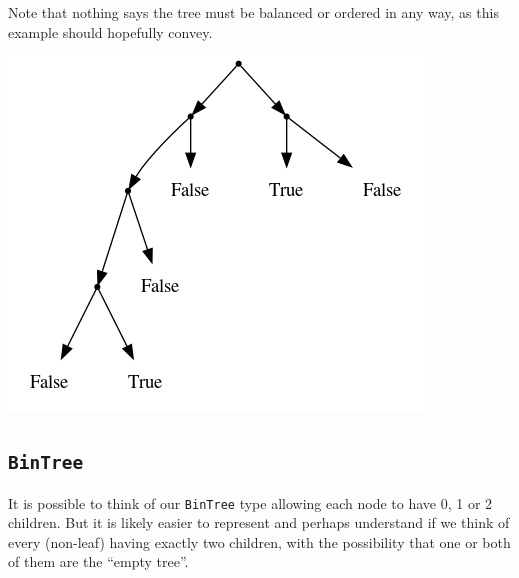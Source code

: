 \documentclass[11pt]{article}
\begin{document}
Note that nothing says the tree must be balanced or ordered
in any way, as this example should hopefully convey.
\begin{center}
\includegraphics[width=\textwidth]{media/LeafTree2.png}
\end{center}

\subsection*{\texttt{BinTree}}
\label{sec:org4c70c40}
It is possible to think of our \texttt{BinTree} type allowing each node
to have 0, 1 or 2 children.
But it is likely easier to represent and perhaps understand
if we think of every (non-leaf) having exactly two children,
with the possibility that one or both of them are the “empty tree”.
\end{document}
